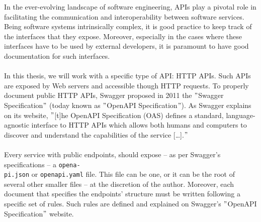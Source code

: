In the ever-evolving landscape of software engineering, APIs play a pivotal role in facilitating the communication and interoperability between software services.
Being software systems intrinsically complex, it is good practice to keep track of the interfaces that they expose.
Moreover, especially in the cases where these interfaces have to be used by external developers, it is paramount to have good documentation for such interfaces. \\ \\
In this thesis, we will work with a specific type of API: HTTP APIs\@.
Such APIs are exposed by Web servers and accessible though HTTP requests.
To properly document public HTTP APIs, Swagger proposed in 2011 the \("\)Swagger Specification\("\) (today known as \("\)OpenAPI Specification\("\)).
As Swagger explains on its website, \("\)[t]he OpenAPI Specification (OAS) defines a standard, language-agnostic interface to HTTP APIs which allows both humans and computers to discover and understand the capabilities of the service [\dots].\("\)~\cite{swagger} \\ \\
Every service with public endpoints, should expose -- as per Swagger's specifications -- a \verb|opena-| \\ \verb|pi.json| or \verb|openapi.yaml| file.
This file can be one, or it can be the root of several other smaller files -- at the discretion of the author.
Moreover, each document that specifies the endpoints' structure must be written following a specific set of rules.
Such rules are defined and explained on Swagger's \("\)OpenAPI Specification\("\) website.
